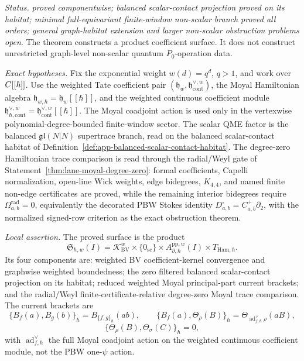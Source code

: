 \begin{stmt}\label{thm:lane-quantum-coefficient-surface}
  \emph{Status.} \emph{proved componentwise; balanced scalar-contact
  projection proved on its habitat; minimal full-equivariant
  finite-window non-scalar branch proved all orders; general
  graph-habitat extension and larger non-scalar obstruction problems
  open}.  The theorem constructs a product coefficient surface.  It does
  not construct unrestricted graph-level non-scalar quantum
  \(P_0\)-operation data.

  \emph{Exact hypotheses.} Fix the exponential weight \(w(d)=q^d\),
  \(q>1\), and work over \(C[[\hbar]]\).  Use the weighted Tate
  coefficient pair
  \((\mathfrak h_w,\mathfrak h^{\vee,w}_{\mathrm{cont}})\), the
  Moyal Hamiltonian algebra \(\mathfrak h_{w,\hbar}=\mathfrak h_w[[\hbar]]\),
  and the weighted continuous coefficient module
  \(\mathfrak h^{\vee,w}_{\hbar,\mathrm{cont}}
  =\mathfrak h^{\vee,w}_{\mathrm{cont}}[[\hbar]]\).
  The Moyal coadjoint action is used only in the vertexwise
  polynomial-degree-bounded finite-window sector.  The scalar QME factor
  is the balanced \(\mathfrak{gl}(N|N)\) supertrace branch, read on the
  balanced scalar-contact habitat of
  Definition~\ref{def:app-balanced-scalar-contact-habitat}.  The
  degree-zero Hamiltonian trace comparison is read through the
  radial/Weyl gate of Statement~\ref{thm:lane-moyal-degree-zero}: formal
  coefficients, Capelli normalization, open-line Wick weights, edge
  bidegrees, \(K_{4,4}\), and named finite non-edge certificates are
  proved, while the remaining interior bidegrees require
  \(\Omega^{\mathrm{rad}}_{a,b}=0\), equivalently the decorated PBW
  Stokes identity \(D^\square_{a,b}=C^+_{a,b}\partial_2\), with the
  normalized signed-row criterion as the exact obstruction theorem.

  \emph{Local assertion.} The proved surface is the product
  \[
    \mathfrak S_{\hbar,w}(I)
      =
      \mathcal K_{\mathrm{BV}}^w
      \times\{0_{\mathrm{sc}}\}
      \times A^{\mathrm{pp},w}_{\partial,\hbar}(I)
      \times T_{\mathrm{Ham},\hbar}.
  \]
  Its four components are: weighted BV coefficient-kernel convergence
  and graphwise weighted boundedness; the zero filtered balanced
  scalar-contact projection on its habitat; reduced weighted Moyal
  principal-part current brackets; and the radial/Weyl
  finite-certificate-relative degree-zero Moyal trace comparison.  The
  current
  brackets are
  \[
    \{B_f(a),B_g(b)\}_\hbar
      =B_{\{f,g\}_\hbar}(ab),\qquad
    \{B_f(a),\Theta_\rho(B)\}_\hbar
      =\Theta_{\operatorname{ad}^{\vee}_{f,\hbar}\rho}(aB),
  \]
  \[
    \{\Theta_\rho(B),\Theta_\sigma(C)\}_\hbar=0,
  \]
  with \(\operatorname{ad}^{\vee}_{f,\hbar}\) the full Moyal coadjoint
  action on the weighted continuous coefficient module, not the PBW
  one-\(\psi\) action.


\end{stmt}
